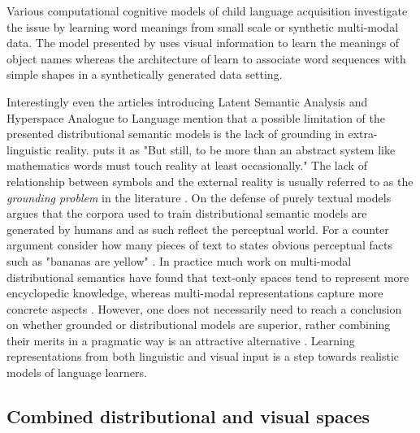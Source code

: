 Various computational cognitive models of child language acquisition investigate the issue
by learning word meanings from small scale or synthetic multi-modal data. The model presented by
\cite{yu2005emergence} uses visual information to learn the meanings of object
names whereas the architecture of \cite{roy2002learning} learn to associate word sequences
with simple shapes in a synthetically generated data setting.

Interestingly even the articles introducing Latent Semantic Analysis
\citep{landauer1997solution} and Hyperspace Analogue to Language \citep{lund1996producing} mention
that a possible limitation of the presented distributional semantic models is the lack of
grounding in extra-linguistic reality. \cite{landauer1997solution} puts it as "But still, to be more than
an abstract system like mathematics words must touch reality at least occasionally."
The lack of relationship between symbols and the external reality is usually referred
to as the \emph{grounding problem} in the literature \citep{harnad1990symbol,perfetti1998limits}.
On the defense of purely textual models \cite{louwerse2011symbol} argues that the corpora
used to train distributional semantic models are generated by humans and as such reflect the perceptual world.
For a counter argument consider how many pieces of text to states obvious perceptual
facts such as "bananas are yellow" \citep{bruni2014multimodal}.
In practice much work on multi-modal distributional semantics have found that text-only spaces tend to
represent more encyclopedic knowledge, whereas multi-modal representations capture more concrete aspects
\citep{andrews2009integrating,baroni2008concepts}. However, one does not necessarily need to
reach a conclusion on whether grounded or distributional models are superior, rather combining their merits in a
pragmatic way is an attractive alternative \citep{riordan2011redundancy}. Learning representations
from both linguistic and visual input is a step towards realistic models of language learners.

\subsection{Combined distributional and visual spaces}
\label{sec:distvis}

